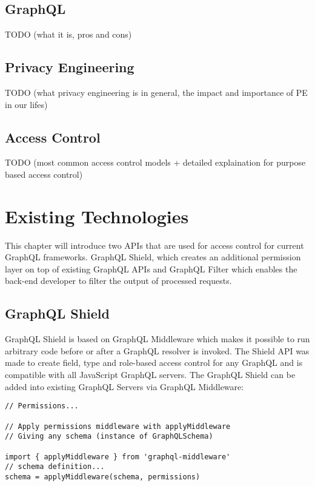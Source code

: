 \documentclass[conference]{IEEEtran}
\begin{document}
\subsection{GraphQL}\label{graphql}

TODO (what it is, pros and cons)

\subsection{Privacy Engineering}\label{privacy}

TODO (what privacy engineering is in general, the impact and importance of PE in our lifes)

\subsection{Access Control}\label{access_control}

TODO (most common access control models + detailed explaination for purpose based access control)

\section{Existing Technologies}\label{ex_tech}

This chapter will introduce two APIs that are used for access control for current GraphQL frameworks. GraphQL Shield, which creates an additional permission layer on top of existing GraphQL APIs and GraphQL Filter which enables the back-end developer to filter the output of processed requests.

\subsection{GraphQL Shield}\label{shield}

GraphQL Shield is based on GraphQL Middleware which makes it possible to run arbitrary code before or after a GraphQL resolver is invoked. The Shield API was made to create field, type and role-based access control for any GraphQL and is compatible with all JavaScript GraphQL servers. The GraphQL Shield can be added into existing GraphQL Servers via GraphQL Middleware:

\begin{lstlisting}[label=some-code,caption=Integration \cite{b1}]
// Permissions...

// Apply permissions middleware with applyMiddleware
// Giving any schema (instance of GraphQLSchema)

import { applyMiddleware } from 'graphql-middleware'
// schema definition...
schema = applyMiddleware(schema, permissions)
\end{lstlisting}
\end{document}
